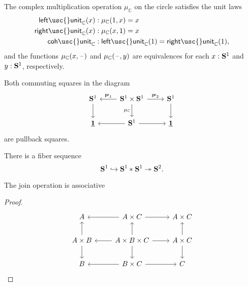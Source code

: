 \begin{lem}
The complex multiplication operation $\mu_{\mathbb{C}}$ on the circle satisfies the unit laws
\begin{align*}
\mathsf{left\usc{}unit}_{\mathbb{C}}(x) & : \mu_{\mathbb{C}}(1,x) = x \\
\mathsf{right\usc{}unit}_{\mathbb{C}}(x) & : \mu_{\mathbb{C}}(x,1) = x \\
\mathsf{coh\usc{}unit}_{\mathbb{C}} & : \mathsf{left\usc{}unit}_{\mathbb{C}}(1)=\mathsf{right\usc{}unit}_{\mathbb{C}}(1),
\end{align*}
and the functions $\mu_{\mathbb{C}}(x,\mathord{\hspace{1pt}\text{--}\hspace{1pt}})$ and $\mu_{\mathbb{C}}(\mathord{\hspace{1pt}\text{--}\hspace{1pt}},y)$ are equivalences for each $x:\mathbf{S}^{1}$ and $y:\mathbf{S}^{1}$, respectively.
\end{lem}

\begin{lem}
Both commuting squares in the diagram
\begin{equation*}
\begin{tikzcd}
\sphere{1} \arrow[d] & \sphere{1}\times\sphere{1} \arrow[d,swap,"\mu_{\mathbb{C}}"] \arrow[l,swap,"\proj 1"] \arrow[r,"\proj 2"] & \sphere{1} \arrow[d] \\
\unit & \sphere{1} \arrow[l] \arrow[r] & \unit
\end{tikzcd}
\end{equation*}
are pullback squares.
\end{lem}

\begin{cor}
There is a fiber sequence
\begin{equation*}
\mathbf{S}^{1}\hookrightarrow {\mathbf{S}^{1}}\ast_{}{\mathbf{S}^{1}} \twoheadrightarrow \mathbf{S}^{2}.
\end{equation*}
\end{cor}

\begin{lem}
The join operation is associative
\end{lem}

\begin{proof}
\begin{equation*}
\begin{tikzcd}
A & A\times C \arrow[l] \arrow[r] & A\times C \\
A\times B \arrow[u] \arrow[d] & A\times B \times C \arrow[r] \arrow[d] \arrow[l] \arrow[u] & A\times C \arrow[u] \arrow[d] \\
B & B\times C \arrow[l] \arrow[r] & C
\end{tikzcd}
\end{equation*}
\end{proof}

